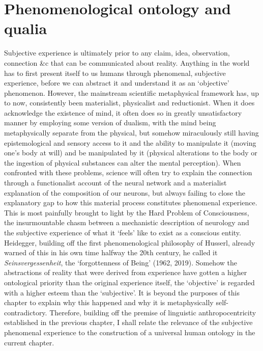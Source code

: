  

\section{Phenomenological ontology and qualia} 

Subjective experience is ultimately prior to any claim, idea, observation, connection \&c that can be communicated about reality. Anything in the world has to first present itself to us humans through phenomenal, subjective experience, before we can abstract it and understand it as an ‘objective’ phenomenon. However, the mainstream scientific metaphysical framework has, up to now, consistently been materialist, physicalist and reductionist. When it does acknowledge the existence of mind, it often does so in greatly unsatisfactory manner by employing some version of dualism, with the mind being metaphysically separate from the physical, but somehow miraculously still having epistemological and sensory access to it and the ability to manipulate it (moving one’s body at will) and be manipulated by it (physical alterations to the body or the ingestion of physical substances can alter the mental perception). When confronted with these problems, science will often try to explain the connection through a functionalist account of the neural network and a materialist explanation of the composition of our neurons, but always failing to close the explanatory gap to how this material process constitutes phenomenal experience. This is most painfully brought to light by the Hard Problem of Consciousness, the insurmountable chasm between a mechanistic description of neurology and the subjective experience of what it ‘feels’ like to exist as a conscious entity. Heidegger, building off the first phenomenological philosophy of Husserl, already warned of this in his own time halfway the 20th century, he called it \textit{Seinsvergessenheit}, the ‘forgottenness of Being’ (1962, 2019). Somehow the abstractions of reality that were derived from experience have gotten a higher ontological priority than the original experience itself, the ‘objective’ is regarded with a higher esteem than the ‘subjective’. It is beyond the purposes of this chapter to explain why this happened and why it is metaphysically self-contradictory. Therefore, building off the premise of linguistic anthropocentricity established in the previous chapter, I shall relate the relevance of the subjective phenomenal experience to the construction of a universal human ontology in the current chapter. 

